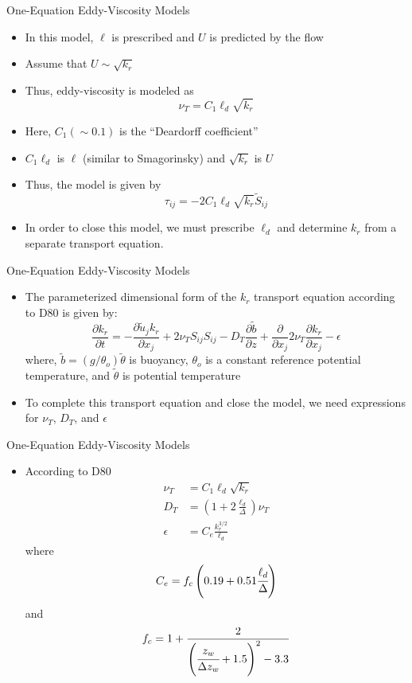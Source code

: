 \begin{frame}{One-Equation Eddy-Viscosity Models}
\begin{itemize}
	\item In this model, $\ell$ is prescribed and $U$ is predicted by the flow
	\item Assume that $U\sim \sqrt{k_r}$
	\item Thus, eddy-viscosity is modeled as
	$$\nu_T = C_1\ell_d\sqrt{k_r}$$
	\item Here, $C_1(\sim0.1)$ is the ``Deardorff coefficient''
	\item $C_1 \ell_d$ is $\ell$ (similar to Smagorinsky) and $\sqrt{k_r}$ is $U$
	\item Thus, the model is given by
	$$\tau_{ij} = -2 C_1\ell_d\sqrt{k_r}\widetilde{S}_{ij}$$
	\item In order to close this model, we must prescribe $\ell_d$ and determine $k_r$ from a separate transport equation.
\end{itemize}

\end{frame}

\begin{frame}{One-Equation Eddy-Viscosity Models}
\begin{itemize}
	\item The parameterized dimensional form of the $k_r$ transport equation according to D80 is given by:
	$$\frac{\partial k_r}{\partial t} = - \frac{\partial \tilde{u}_j k_r}{\partial x_j} + 2 \nu_T S_{ij}S_{ij} - D_T \frac{\partial \tilde{b}}{\partial z} \nonumber + \frac{\partial}{\partial x_j}2 \nu_T \frac{\partial k_r}{\partial x_j} - \epsilon$$
	where, $\tilde{b} = (g/\theta_o)\tilde{\theta}$ is buoyancy, $\theta_o$ is a constant reference potential temperature, and $\tilde{\theta}$ is potential temperature
	\item To complete this transport equation and close the model, we need expressions for $\nu_T$, $D_T$, and $\epsilon$
\end{itemize}

\end{frame}

\begin{frame}{One-Equation Eddy-Viscosity Models}
\begin{itemize}
	\item According to D80
	\begin{align*}
		\nu_T &= C_1\ell_d\sqrt{k_r}	\\
		D_T &= \left( 1 + 2\frac{\ell_d}{\Delta} \right)\nu_T \\
		\epsilon &= C_e \frac{k_r^{3/2}}{\ell_d}
	\end{align*}
	where$$C_e = f_c \left(0.19+0.51 \cfrac{\ell_d}{\Delta}\right)$$
	and$$f_c = 1 + \frac{2}{\left(\cfrac{z_w}{\Delta z_w} + 1.5\right)^2 - 3.3}$$

\end{itemize}

\end{frame}


